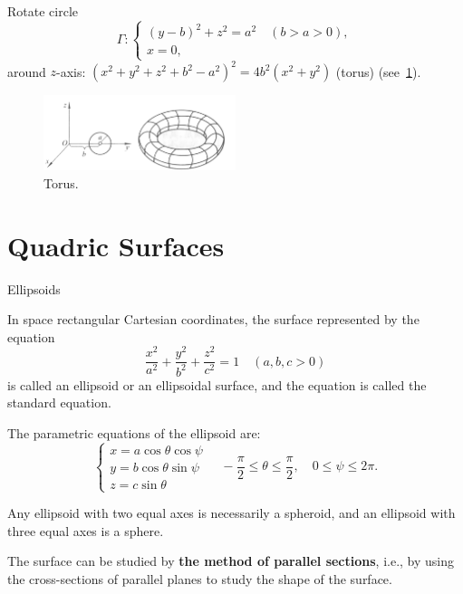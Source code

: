 \documentclass[11pt]{../../TexTemplate/elegantbook} %
\begin{document}
\noindent Rotate circle
\[
\Gamma: \begin{cases} (y-b)^{2}+z^{2}=a^{2}\quad (b>a>0), \\ x = 0, \end{cases}
\]
around \(z\)-axis: \((x^{2}+y^{2}+z^{2}+b^{2}-a^{2})^{2}=4b^{2}(x^{2}+y^{2})\) (torus)
(see~\ref{fig:torus}).
\begin{figure}[h]
    \centering
    \includegraphics[width=0.5\textwidth]{img/circle.png}
    \caption{Torus.}
    \label{fig:torus}
\end{figure}



\section{Quadric Surfaces}
\begin{leftbarTitle}{Ellipsoids}\end{leftbarTitle}
In space rectangular Cartesian coordinates, 
the surface represented by the equation   
\[ 
\frac{x^{2}}{a^{2}} + \frac{y^{2}}{b^{2}} + \frac{z^{2}}{c^{2}} = 1\quad  (  a  ,  b  ,  c  >  0  )  
\] 
is called an ellipsoid or an ellipsoidal surface, 
and the equation is called the standard equation. 

The parametric equations of the ellipsoid are: 
\[
\begin{cases}
x = a \cos \theta \cos \psi \\
y = b \cos \theta \sin \psi \\
z = c \sin \theta
\end{cases}
\quad   -\frac{\pi}{2} \leq \theta \leq \frac{\pi}{2},\quad 0 \leq \psi \leq 2\pi.
\]

Any ellipsoid with two equal axes is necessarily a spheroid, 
and an ellipsoid with three equal axes is a sphere. 

The surface can be studied by \textbf{the method of parallel sections}, i.e., 
by using the cross-sections of parallel planes to study the shape of the surface. 
\end{document}
